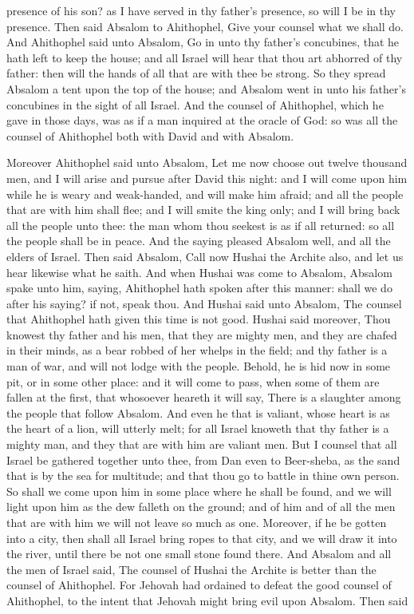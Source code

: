 presence of his son? as I have served in thy father’s presence, so will I be in thy presence.  Then said Absalom to Ahithophel, Give your counsel what we shall do. And Ahithophel said unto Absalom, Go in unto thy father’s concubines, that he hath left to keep the house; and all Israel will hear that thou art abhorred of thy father: then will the hands of all that are with thee be strong. So they spread Absalom a tent upon the top of the house; and Absalom went in unto his father’s concubines in the sight of all Israel. And the counsel of Ahithophel, which he gave in those days, was as if a man inquired at the oracle of God: so was all the counsel of Ahithophel both with David and with Absalom. 

Moreover Ahithophel said unto Absalom, Let me now choose out twelve thousand men, and I will arise and pursue after David this night: and I will come upon him while he is weary and weak-handed, and will make him afraid; and all the people that are with him shall flee; and I will smite the king only; and I will bring back all the people unto thee: the man whom thou seekest is as if all returned: so all the people shall be in peace. And the saying pleased Absalom well, and all the elders of Israel.  Then said Absalom, Call now Hushai the Archite also, and let us hear likewise what he saith. And when Hushai was come to Absalom, Absalom spake unto him, saying, Ahithophel hath spoken after this manner: shall we do after his saying? if not, speak thou. And Hushai said unto Absalom, The counsel that Ahithophel hath given this time is not good. Hushai said moreover, Thou knowest thy father and his men, that they are mighty men, and they are chafed in their minds, as a bear robbed of her whelps in the field; and thy father is a man of war, and will not lodge with the people. Behold, he is hid now in some pit, or in some other place: and it will come to pass, when some of them are fallen at the first, that whosoever heareth it will say, There is a slaughter among the people that follow Absalom. And even he that is valiant, whose heart is as the heart of a lion, will utterly melt; for all Israel knoweth that thy father is a mighty man, and they that are with him are valiant men. But I counsel that all Israel be gathered together unto thee, from Dan even to Beer-sheba, as the sand that is by the sea for multitude; and that thou go to battle in thine own person. So shall we come upon him in some place where he shall be found, and we will light upon him as the dew falleth on the ground; and of him and of all the men that are with him we will not leave so much as one. Moreover, if he be gotten into a city, then shall all Israel bring ropes to that city, and we will draw it into the river, until there be not one small stone found there. And Absalom and all the men of Israel said, The counsel of Hushai the Archite is better than the counsel of Ahithophel. For Jehovah had ordained to defeat the good counsel of Ahithophel, to the intent that Jehovah might bring evil upon Absalom.  Then said 